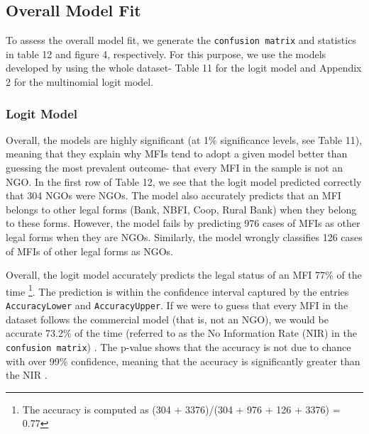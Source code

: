 \documentclass[a4paper,nobind]{templates/ociamthesis}
\begin{document}
\hypertarget{overall-model-fit}{%
\subsection{Overall Model Fit}\label{overall-model-fit}}

To assess the overall model fit, we generate the \texttt{confusion\ matrix} and statistics in table 12 and figure 4, respectively. For this purpose, we use the models developed by using the whole dataset- Table 11 for the logit model and Appendix 2 for the multinomial logit model.

\hypertarget{logit-model}{%
\subsubsection{Logit Model}\label{logit-model}}

Overall, the models are highly significant (at 1\% significance levels, see Table 11), meaning that they explain why MFIs tend to adopt a given model better than guessing the most prevalent outcome- that every MFI in the sample is not an NGO. In the first row of Table 12, we see that the logit model predicted correctly that 304 NGOs were NGOs. The model also accurately predicts that an MFI belongs to other legal forms (Bank, NBFI, Coop, Rural Bank) when they belong to these forms. However, the model fails by predicting 976 cases of MFIs as other legal forms when they are NGOs. Similarly, the model wrongly classifies 126 cases of MFIs of other legal forms as NGOs.

Overall, the logit model accurately predicts the legal status of an MFI 77\% of the time \footnote{The accuracy is computed as (304 + 3376)/(304 + 976 + 126 + 3376) = 0.77}. The prediction is within the confidence interval captured by the entries \texttt{AccuracyLower} and \texttt{AccuracyUpper}. If we were to guess that every MFI in the dataset follows the commercial model (that is, not an NGO), we would be accurate 73.2\% of the time (referred to as the No Information Rate (NIR) in the \texttt{confusion\ matrix}) \autocite{cavalin2018confusion}. The p-value shows that the accuracy is not due to chance with over 99\% confidence, meaning that the accuracy is significantly greater than the NIR \autocite{kleinbaum2002logistic}.
\end{document}
